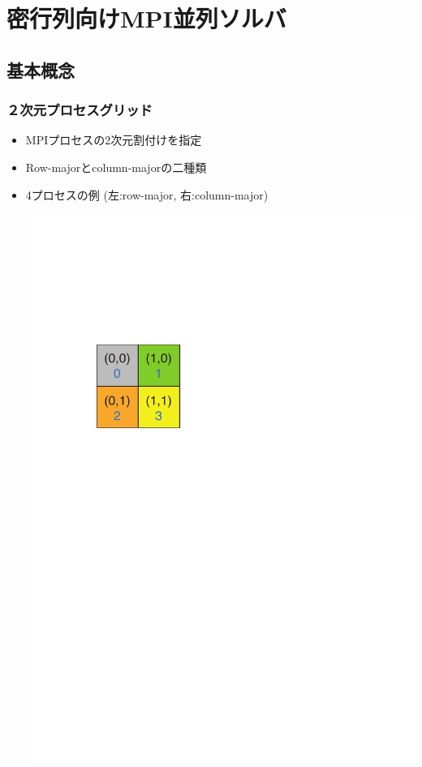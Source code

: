 \section{密行列向けMPI並列ソルバ}

\subsection{基本概念}

\begin{frame}
  \frametitle{２次元プロセスグリッド}
  \begin{itemize}
  \item MPIプロセスの2次元割付けを指定
  \item Row-majorとcolumn-majorの二種類
  \item 4プロセスの例 (左:row-major, 右:column-major)
  \begin{center}
    \includegraphics[height=0.25\textheight]{figure/grid-row-major.pdf} \ \ \ \

\end{center}
\end{itemize}
\end{frame}
